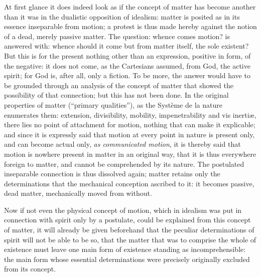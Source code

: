 At first glance it does indeed look as if the concept of matter has
become another than it was in the dualistic opposition of idealism:
matter is posited as in its essence inseparable from motion; a protest
is thus made hereby against the notion of a dead, merely passive
matter. The question: whence comes motion? is answered with: whence
should it come but from matter itself, the sole existent? But this is
for the present nothing other than an expression, positive in form, of
the negative: it does not come, as the Cartesians assumed, from God, the
active spirit; for God is, after all, only a fiction. To be more, the
answer would have to be grounded through an analysis of the concept of
matter that showed the possibility of that connection; but this has not
been done. In the original properties of matter
(``primary qualities''),
as the Système de la nature enumerates them: extension, divisibility,
mobility, impenetrability and vis inertiæ, there lies no point of
attachment for motion, nothing that can make it explicable; and since
it is expressly said that motion at every point in nature is present
only, and can become actual only, \emph{as communicated motion}, it is
thereby said that motion is nowhere present in matter in an original
way, that it is thus everywhere foreign to matter, and cannot be
comprehended by its nature. The postulated inseparable connection is
thus dissolved again; matter retains only the determinations that the
mechanical conception ascribed to it: it becomes passive, dead matter,
mechanically moved from without.

Now if not even the physical concept of motion, which in
idealism was put in connection with spirit only by a postulate, could be
explained from this concept of matter, it will already be given
beforehand that the peculiar determinations of spirit will not be able
to be so, that the matter that was to comprise the whole of existence
must leave one main form of existence standing as incomprehensible: the
main form whose essential determinations were precisely originally
excluded from its concept.

